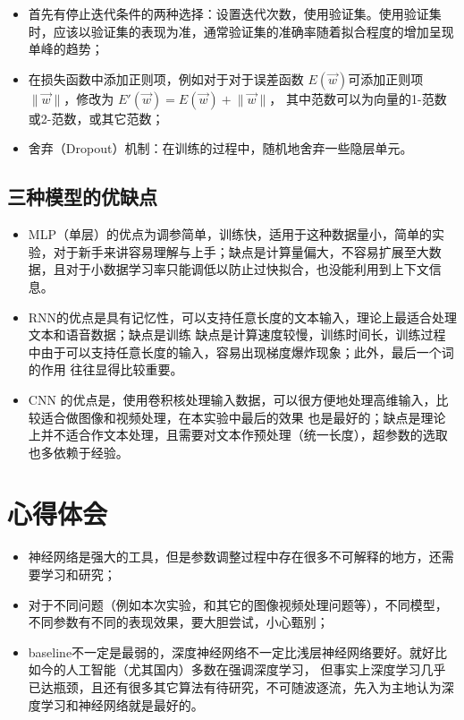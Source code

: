 \documentclass[a4paper]{article}
\begin{document}
    \begin{itemize}
        \item 首先有停止迭代条件的两种选择：设置迭代次数，使用验证集。使用验证集时，应该以验证集的表现为准，通常验证集的准确率随着拟合程度的增加呈现单峰的趋势；
        \item 在损失函数中添加正则项，例如对于对于误差函数 $E(\vec{w})$可添加正则项 $\lVert \vec{w} \rVert$，修改为 $E'(\vec{w})=E(\vec{w})+\lVert \vec{w} \rVert$，
        其中范数可以为向量的1-范数或2-范数，或其它范数；
        \item 舍弃（Dropout）机制：在训练的过程中，随机地舍弃一些隐层单元。
    \end{itemize}

    \subsection{三种模型的优缺点}

    \begin{itemize}
        \item MLP（单层）的优点为调参简单，训练快，适用于这种数据量小，简单的实验，对于新手来讲容易理解与上手；缺点是计算量偏大，不容易扩展至大数据，且对于小数据学习率只能调低以防止过快拟合，也没能利用到上下文信息。
        \item RNN的优点是具有记忆性，可以支持任意长度的文本输入，理论上最适合处理文本和语音数据；缺点是训练
        缺点是计算速度较慢，训练时间长，训练过程中由于可以支持任意长度的输入，容易出现梯度爆炸现象；此外，最后一个词的作用
        往往显得比较重要。
        \item CNN 的优点是，使用卷积核处理输入数据，可以很方便地处理高维输入，比较适合做图像和视频处理，在本实验中最后的效果
        也是最好的；缺点是理论上并不适合作文本处理，且需要对文本作预处理（统一长度），超参数的选取也多依赖于经验。
    \end{itemize}

    
    \section{心得体会}

    \begin{itemize}
        \item 神经网络是强大的工具，但是参数调整过程中存在很多不可解释的地方，还需要学习和研究；
        \item 对于不同问题（例如本次实验，和其它的图像视频处理问题等），不同模型，不同参数有不同的表现效果，要大胆尝试，小心甄别；
        \item baseline不一定是最弱的，深度神经网络不一定比浅层神经网络要好。就好比如今的人工智能（尤其国内）多数在强调深度学习，
        但事实上深度学习几乎已达瓶颈，且还有很多其它算法有待研究，不可随波逐流，先入为主地认为深度学习和神经网络就是最好的。
    \end{itemize}
    
    
\end{document}
